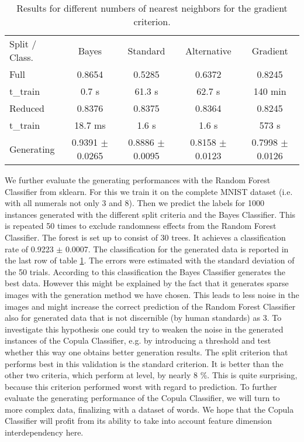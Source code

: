 \documentclass{article}
\begin{document}
\begin{table}[h]
	\centering
	\begin{tabular}{l c c c c}
		Split / Class.&	Bayes 	& Standard	& Alternative 	& Gradient	\\
		Full		&	0.8654	&	0.5285	&	0.6372		& 0.8245	\\
	 	t\_train	&   0.7 s	&	61.3 s	&	62.7 s		& 140 min	\\
		Reduced 	& 	0.8376	&	0.8375	&	0.8364		& 0.8245	\\
		t\_train	&   18.7 ms	&	1.6 s	&   1.6 s		& 573 s		\\
   		Generating	& 	0.9391 $\pm$ 0.0265	&	0.8886 $\pm$ 0.0095		& 0.8158 $\pm$ 0.0123 & 0.7998 $\pm$ 0.0126 \\
	\end{tabular}
	\caption{Results for different numbers of nearest neighbors for the gradient criterion.}
	\label{tab5}
\end{table}

We further evaluate the generating performances with the Random Forest Classifier from sklearn.
For this we train it on the complete MNIST dataset (i.e. with all numerals not only 3 and 8).
Then we predict the labels for 1000 instances generated with the different split criteria and 
the Bayes Classifier. This is repeated 50 times to exclude randomness effects from the Random Forest Classifier.
The forest is set up to consist of 30 trees.
It achieves a classification rate of 0.9223 $\pm$ 0.0007.
The classification for the generated data is reported in the last row of table \ref{tab5}. 
The errors were estimated with the standard deviation of the 50 trials.
\newline
According to this classification the Bayes Classifier generates the best data. However this might
be explained by the fact that it generates sparse images with the generation method we have chosen.
This leads to less noise in the images and might increase the correct prediction of the Random Forest Classifier 
also for generated data that is not discernible (by human standards) as 3.
To investigate this hypothesis one could try to weaken the noise in the generated instances of the Copula Classifier,
e.g. by introducing a threshold and test whether this way one obtains better generation results.
\newline
The split criterion that performs best in this validation is the standard criterion.
It is better than the other two criteria, which perform at level, by nearly 8 \%.
This is quite surprising, because this criterion performed worst with regard to prediction.
\newline
To further evaluate the generating performance of the Copula Classifier, we will turn to more complex data,
finalizing with a dataset of words. We hope that the Copula Classifier will profit from its ability to take into 
account feature dimension interdependency here.
\end{document}

